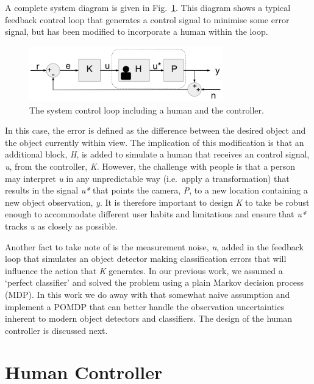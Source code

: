 \documentclass[runningheads]{llncs}
\newcommand\todo[1]{\textcolor{red}{#1}}
\begin{document}
A complete system diagram is given in Fig.~\ref{fig:sys-diagram}. 
This diagram shows a typical feedback control loop that generates a control signal to minimise some error signal, but has been modified to incorporate a human within the loop.

\begin{figure}
  \centering
  \includegraphics[width=0.75\textwidth]{figures/control_loop.png}
  \caption{The system control loop including a human and the controller.}\label{fig:sys-diagram}
\end{figure}

In this case, the error is defined as the difference between the desired object and the object currently within view. 
The implication of this modification is that an additional block, \emph{H}, is added to simulate a human that receives an control signal, \emph{u}, from the controller, \emph{K}. 
However, the challenge with people is that a person may interpret \emph{u} in any unpredictable way (i.e.\ apply a transformation) that results in the signal \emph{u*} that points the camera, \emph{P}, to a new location containing a new object observation, \emph{y}.
It is therefore important to design \emph{K} to take be robust enough to accommodate different user habits and limitations and ensure that \emph{u*} tracks \emph{u} as closely as possible. 

Another fact to take note of is the measurement noise, \emph{n}, added in the feedback loop that simulates an object detector making classification errors that will influence the action that \emph{K} generates. 
In our previous work, we assumed a `perfect classifier' and solved the problem using a plain Markov decision process (MDP). 
In this work we do away with that somewhat naive assumption and implement a POMDP that can better handle the observation uncertainties inherent to modern object detectors and classifiers. 
The design of the human controller is discussed next. 

\section{Human Controller}\label{sec:human-controller}
\end{document}
